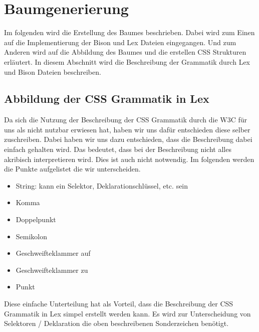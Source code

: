\section{Baumgenerierung}
Im folgenden wird die Erstellung des Baumes beschrieben. Dabei wird zum Einen auf die Implementierung der Bison und Lex Dateien eingegangen. Und zum Anderen wird auf die Abbildung des Baumes und die erstellen CSS Strukturen erläutert.
In diesem Abschnitt wird die Beschreibung der Grammatik durch Lex und Bison Dateien beschreiben. 
\subsection{Abbildung der CSS Grammatik in Lex}
\label{tree_generation_lex}
Da sich die Nutzung der Beschreibung der CSS Grammatik durch die W3C für uns als nicht nutzbar erwiesen hat, haben wir uns dafür entschieden diese selber zuschreiben. Dabei haben wir uns dazu entschieden, dass die Beschreibung dabei einfach gehalten wird. Das bedeutet, dass bei der Beschreibung nicht alles akribisch interpretieren wird. Dies ist auch nicht notwendig. Im folgenden werden die Punkte aufgelistet die wir unterscheiden. 
\begin{itemize}
\item{String: kann ein Selektor, Deklarationschlüssel, etc. sein} 
\item{Komma} 
\item{Doppelpunkt} 
\item{Semikolon} 
\item{Geschweifteklammer auf} 
\item{Geschweifteklammer zu} 
\item{Punkt} 
\end{itemize}
Diese einfache Unterteilung hat als Vorteil, dass die Beschreibung der CSS Grammatik in Lex simpel erstellt werden kann. Es wird zur Unterscheidung von Selektoren / Deklaration die oben beschreibenen Sonderzeichen benötigt. 
